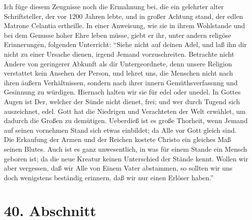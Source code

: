 Ich füge diesem Zeugnisse noch die Ermahnung bei, die ein gelehrter alter Schriftsteller, der vor 1200 Jahren lebte, und in großer Achtung stand, der edlen Matrone Celantia ertheille. In einer Anweisung, wie sie in ihrem Wohlstande und bei dem Genusse hoher Ehre leben müsse, giebt er ihr, unter andern religöse Erinnerungen, folgenden Unterricht: "`Siehe nicht auf deinen Adel, und laß ihn dir nicht zu einer Ursache dienen, irgend Jemand vorzuschreiten. Betrachte nicht Andere von geringerer Abkunft als dir Untergeordnete, denn unsere Religion verstattet kein Ansehen der Person, und lehret uns, die Menschen nicht nach ihren äußern Verhältnissen, sondern nach ihrer innern Gemüthsverfassnng und Gesinnung zu würdigen. Hiernach halten wir sie für edel oder unedel. In Gottes Augen ist Der, welcher der Sünde nicht dienet, frei; und wer durch Tugend sich auszeichnet, edel. Gott hat die Niedrigen und Verachteten der Welt erwählet, um dadurch die Großen zu demütigen. Ueberdieß ist es große Thorheit, wenn Jemand auf seinen vornehmen Stand sich etwas einbildet; da Alle vor Gott gleich sind. Die Erkaufung der Armen und der Reichen kostete Christo ein gleiches Maß seinen Blutes. Auch ist es ganz unwesentlich, in was für einem Stande ein Mensch geboren ist; da die neue Kreatur keinen Unterschied der Stände kennt. Wollen wir aber vergessen, daß wir Alle von Einem Vater abstammen, so sollten wir uns doch wenigstens beständig erinnern, daß wir nur einen Erlöser haben."'

\section{40. Abschnitt}

